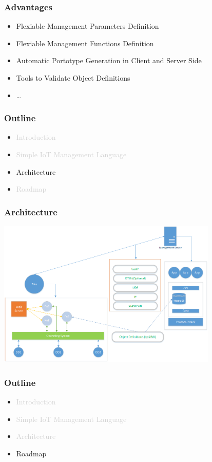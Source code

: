 \documentclass{beamer}
\begin{document}
\begin{frame}
	\frametitle{Advantages}
	\begin{itemize}
		\item Flexiable Management Parameters Definition
		\item Flexiable Management Functions Definition
		\item Automatic Portotype Generation in Client and Server Side
		\item Tools to Validate Object Definitions
		\item \ldots
	\end{itemize}
\end{frame}

\begin{frame}
	\frametitle{Outline}
	\vspace{.1cm}
	\begin{itemize}
		\justifying
		\item \textcolor{LightGray}{Introduction}
		\item \textcolor{LightGray}{Simple IoT Management Language}
		\item Architecture
		\item \textcolor{LightGray}{Roadmap}
	\end{itemize}
\end{frame}

\begin{frame}
	\frametitle{Architecture}
	\vspace{.1cm}
	\hspace*{.75cm} \includegraphics[width=10.5cm]{../architecture/architecture.png}
\end{frame}

\begin{frame}
	\frametitle{Outline}
	\vspace{.1cm}
	\begin{itemize}
		\justifying
		\item \textcolor{LightGray}{Introduction}
		\item \textcolor{LightGray}{Simple IoT Management Language}
		\item \textcolor{LightGray}{Architecture}
		\item Roadmap
	\end{itemize}
\end{frame}
\end{document}
